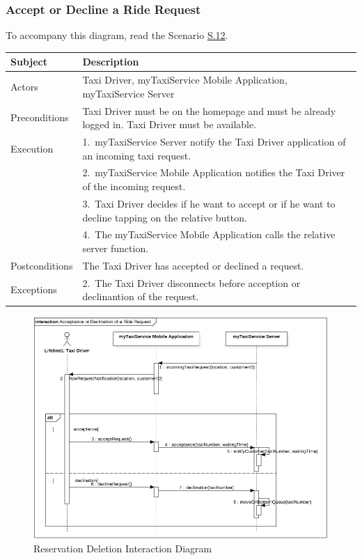 \subsubsection{Accept or Decline a Ride Request}
			To accompany this diagram, read the Scenario \hyperref[sec:AcceptDeclineRequestScenario]{S.12}.

				\begin{table}[htpb]
					\centering
					\label{tab:AcceptDeclineRequestTable}
					\begin{tabularx}{\textwidth}{lp{9cm}}
						\hline
						\hline
							\textbf{Subject}
						& 
							\textbf{Description}\\
						\hline
							Actors	       &  Taxi Driver, myTaxiService Mobile Application, myTaxiService Server\\
						\hline
							Preconditions  &  Taxi Driver must be on the homepage and must be already logged in. Taxi Driver must be available.\\
						\hline
							Execution      &  1.~myTaxiService Server notify the Taxi Driver application of an incoming taxi request.\\
										   &  2.~myTaxiService Mobile Application notifies the Taxi Driver of the incoming request.\\
										   &  3.~Taxi Driver decides if he want to accept or if he want to decline tapping on the relative button.\\
										   &  4.~The myTaxiService Mobile Application calls the relative server function.\\
						\hline
							Postconditions &  The Taxi Driver has accepted or declined a request.\\
						\hline
							Exceptions     &  2.~The Taxi Driver disconnects before acception or declinantion of the request.\\
									
						\hline
						\hline
					\end{tabularx}
				\end{table}
				
				\begin{figure}[H]
					\centering
					\includegraphics[width=\textwidth, scale=0.5]{IMG/InteractionDiagrams/AcceptDeclineRequest.png}
					\caption{Reservation Deletion Interaction Diagram}\label{sec:FigureAcceptDeclineRequest}
				\end{figure}